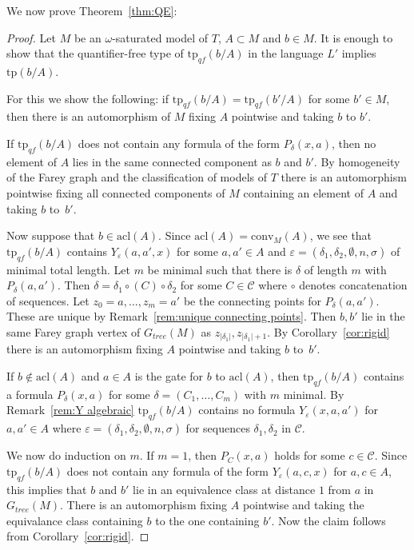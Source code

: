 \documentclass{amsart}
\renewcommand{\d}{\delta}
\renewcommand{\epsilon}{\varepsilon}
\newcommand{\C}{\mathcal{C}}
\newcommand{\conv}{\mathrm{conv}}
\newcommand{\acl}{\mathrm{acl}}
\newcommand{\tp}{\mathrm{tp}}
\begin{document}
We now prove Theorem~\ref{thm:QE}:
\begin{proof}
Let $M$ be an $\omega$-saturated model of $T$, $A\subset M$ and $b\in M$. It is enough to show that the quantifier-free type of $\tp_{qf}(b/A)$ in the language $L'$ implies $\tp(b/A)$.

For this we show the following: if  $\tp_{qf}(b/A)=\tp_{qf}(b'/A)$ for some $b'\in M$, then there is an automorphism of $M$ fixing $A$ pointwise and taking $b$ to $b'$.

If $\tp_{qf}(b/A)$ does not contain any formula of the form $P_\d(x,a)$, then no element of $A$ lies in the same connected component as $b$ and $b'$. By homogeneity of the Farey graph and the classification of models of $T$ there is an automorphism pointwise fixing all connected components of $M$ containing an element of $A$ and taking $b$ to~$b'$.


Now suppose that $b\in\acl(A)$. Since $\acl(A)=\conv_M(A)$,  we see that $\tp_{qf}(b/A)$ contains $Y_\epsilon(a,a',x)$ for some $a,a'\in A$ and $\epsilon=(\d_1,\d_2,\emptyset,n,\sigma)$ of minimal total length. Let  $m$ be minimal such that there is $\d$ of length $m$ with $P_\d(a,a')$. Then $\d=\d_1\circ(C)\circ\d_2$ for some $C\in\C$ where $\circ$ denotes concatenation of sequences. Let $z_0=a,\ldots, z_m=a'$ be the connecting points for $P_\d(a,a')$. These are unique
by Remark~\ref{rem:unique connecting points}. Then $b,b'$ lie in the same Farey graph vertex of $G_{tree}(M)$ 
as $z_{|\d_1|}, z_{|\d_1|+1}$. By Corollary~\ref{cor:rigid} there is an automorphism fixing $A$ pointwise and taking $b$ to~$b'$.



If $b\notin\acl(A)$ and  $a\in A$ is the gate for $b$ to $\acl(A)$, then $\tp_{qf}(b/A)$ contains a formula $P_\d(x,a)$ for some $\d=(C_1,\ldots, C_m)$ with $m$ minimal. By Remark~\ref{rem:Y algebraic} $\tp_{qf}(b/A)$ contains no formula  $Y_\epsilon(x,a,a')$ for $a,a'\in A$ where $\epsilon=(\d_1,\d_2,\emptyset,n,\sigma)$ for sequences $\d_1,\d_2$ in $\C$.

We now do induction on $m$. If $m=1$, then $P_C(x,a)$ holds for some $c\in\C$. Since  $\tp_{qf}(b/A)$ does not contain any formula of the form $Y_\epsilon(a,c,x)$ for $a,c\in A$, this implies that $b$ and $b'$ lie in an equivalence class at distance $1$ from $a$ in $G_{tree}(M)$. There is an automorphism fixing $A$ pointwise and taking the equivalance class containing $b$ to the one containing $b'$. Now the claim follows from Corollary~\ref{cor:rigid}.


\end{proof}
\end{document}
